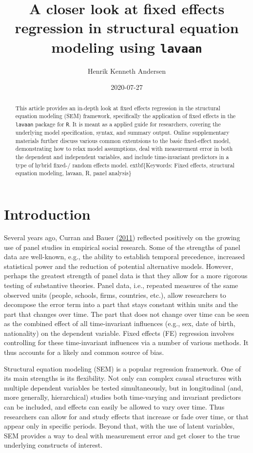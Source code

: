\documentclass[
  12pt,
  a4paper]{article}
\title{\singlespacing A closer look at fixed effects regression in structural
equation modeling using \texttt{lavaan}}
\author{Henrik Kenneth Andersen}
\date{2020-07-27}
\begin{document}
\maketitle
\begin{abstract}
This article provides an in-depth look at fixed effects regression in
the structural equation modeling (SEM) framework, specifically the
application of fixed effects in the \texttt{lavaan} package for
\texttt{R}. It is meant as a applied guide for researchers, covering the
underlying model specification, syntax, and summary output. Online
supplementary materials further discuss various common extentsions to
the basic fixed-effect model, demonstrating how to relax model
assumptions, deal with measurement error in both the dependent and
independent variables, and include time-invariant predictors in a type
of hybrid fixed-/ random effects model. extbf\{Keywords: Fixed effects,
structural equation modeling, lavaan, R, panel analysis\}
\end{abstract}

\newpage

\setcounter{page}{1}

\hypertarget{intro}{%
\section{Introduction}\label{intro}}

Several years ago, Curran and Bauer
(\protect\hyperlink{ref-Curran2011}{2011}) reflected positively on the
growing use of panel studies in empirical social research. Some of the
strengths of panel data are well-known, e.g., the ability to establish
temporal precedence, increased statistical power and the reduction of
potential alternative models. However, perhaps the greatest strength of
panel data is that they allow for a more rigorous testing of substantive
theories. Panel data, i.e., repeated measures of the same observed units
(people, schools, firms, countries, etc.), allow researchers to
decompose the error term into a part that stays constant within units
and the part that changes over time. The part that does not change over
time can be seen as the combined effect of all time-invariant influences
(e.g., sex, date of birth, nationality) on the dependent variable. Fixed
effects (FE) regression involves controlling for these time-invariant
influences via a number of various methods. It thus accounts for a
likely and common source of bias.

Structural equation modeling (SEM) is a popular regression framework.
One of its main strengths is its flexibility. Not only can complex
causal structures with multiple dependent variables be tested
simultaneously, but in longitudinal (and, more generally, hierarchical)
studies both time-varying and invariant predictors can be included, and
effects can easily be allowed to vary over time. Thus researchers can
allow for and study effects that increase or fade over time, or that
appear only in specific periods. Beyond that, with the use of latent
variables, SEM provides a way to deal with measurement error and get
closer to the true underlying constructs of interest.
\end{document}
